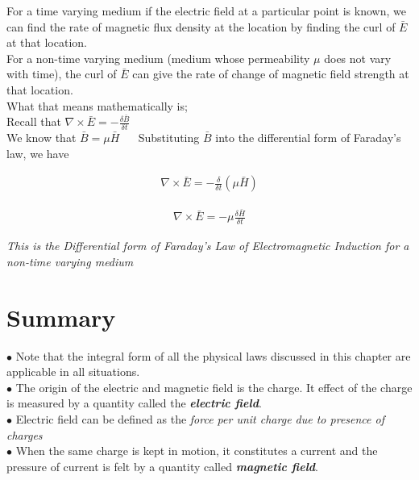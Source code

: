 	
	For a time varying medium if the electric field at a particular point is known, we can find the rate of magnetic flux density at the location by finding the curl of $\bar{E}$ at that location.\\
	
	For a non-time varying medium (medium whose permeability $\mu$ does not vary with time), the curl of $\bar{E}$ can give the rate of change of magnetic field strength at that location.\\
	
	What that means mathematically is; \\Recall that $\nabla \times \bar{E} = - \frac{\delta\bar{B}}{\delta t}$\\
	We know that $\bar{B} = \mu \bar{H}$ $\quad$ Substituting $\bar{B}$ into the differential form of Faraday's law, we have	
	
	\begin{align*}
	\nabla \times \bar{E} = - \frac{\delta}{\delta t} (\mu\bar{H})
	\end{align*}
	
	\begin{align}	 
	\nabla \times \bar{E} = -\mu\frac{\delta \bar{H}}{\delta t}
	\end{align}
	\begin{center}
		\emph{This is the Differential form of Faraday's Law of Electromagnetic Induction for a non-time varying medium}
	\end{center}
	
	
	\section{Summary}
	$\bullet$ Note that the integral form of all the physical laws discussed in this chapter are applicable in all situations.\\
	
	$\bullet$ The origin of the electric and magnetic field is the charge. It effect of the charge is measured by a quantity called the \textbf{\emph{electric field}}.\\
	
	$\bullet$ Electric field can be defined as the \emph{force per unit charge due to presence of charges} \\
	
	$\bullet$ When the same charge is kept in motion, it constitutes a current and the pressure of current is felt by a quantity called \textbf{\emph{magnetic field}}.\\
	
